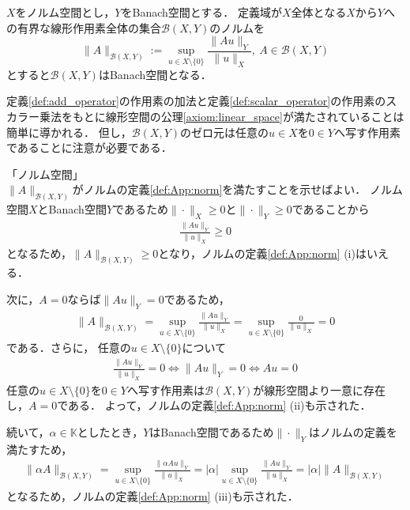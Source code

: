 \begin{Thm}\label{thm:set_bound_linear_operator}
	$X$をノルム空間とし，$Y$をBanach空間とする．
	定義域が$X$全体となる$X$から$Y$への有界な線形作用素全体の集合${\mathcal B}(X, Y)$のノルムを
	\begin{equation}
		\| A \|_{{\mathcal B}(X,Y)} := \sup_{ u \in X \setminus \{ 0 \}} \frac{ \| Au \|_{Y} }{ \| u \|_{X} }, ~ A \in {\mathcal B}(X, Y) \label{def:operator_norm}
	\end{equation}
	とすると${\mathcal B}(X, Y)$はBanach空間となる．
\end{Thm}

\begin{Proof}

定義\ref{def:add_operator}の作用素の加法と定義\ref{def:scalar_operator}の作用素のスカラー乗法をもとに線形空間の公理\ref{axiom:linear_space}が満たされていることは簡単に導かれる．
但し，${\mathcal B}(X, Y)$のゼロ元は任意の$u \in X$を$0 \in Y$へ写す作用素であることに注意が必要である．

\noindent 「ノルム空間」\\
$\| A \|_{{\mathcal B}(X,Y)}$がノルムの定義\ref{def:App:norm}を満たすことを示せばよい．
ノルム空間$X$とBanach空間$Y$であるため$\| \cdot \|_{X} \ge 0$と$\| \cdot \|_{Y} \ge 0$であることから
\begin{align*}
 \frac{ \| Au \|_{Y} }{ \| u \|_{X} } \ge 0
\end{align*}
となるため，$\| A \|_{{\mathcal B}(X,Y)} \ge 0$となり，ノルムの定義\ref{def:App:norm} (i)はいえる．

次に，$A = 0$ならば$\| A u \|_{Y} = 0$であるため，
\begin{align*}
\| A \|_{{\mathcal B}(X,Y)} = \sup_{ u \in X \setminus \{ 0 \}} \frac{ \| Au \|_{Y} }{ \| u \|_{X} } = \sup_{ u \in X \setminus \{ 0 \}} \frac{ 0 }{ \| u \|_{X} } =  0
\end{align*}
である．さらに，
任意の$u \in X \setminus \{ 0 \}$について
\begin{align*}
\frac{ \| Au \|_{Y} }{ \| u \|_{X} } = 0 \Leftrightarrow \| Au \|_{Y} = 0 \Leftrightarrow Au = 0
\end{align*}
任意の$u \in X \setminus \{ 0 \}$を$0 \in Y$へ写す作用素は${\mathcal B}(X, Y)$が線形空間より一意に存在し，$A = 0$である．
よって，ノルムの定義\ref{def:App:norm} (ii)も示された．

続いて，$\alpha \in {\mathbb K}$としたとき，$Y$はBanach空間であるため$\| \cdot \|_Y$はノルムの定義を満たすため，
\begin{align*}
\|  \alpha A \|_{{\mathcal B}(X,Y)} = \sup_{ u \in X \setminus \{ 0 \}} \frac{ \| \alpha Au \|_{Y} }{ \| u \|_{X} } = | \alpha | \sup_{ u \in X \setminus \{ 0 \}} \frac{ \| Au \|_{Y} }{ \| u \|_{X} } = | \alpha | \|   A \|_{{\mathcal B}(X,Y)}
\end{align*}
となるため，ノルムの定義\ref{def:App:norm} (iii)も示された．


\end{Proof}
